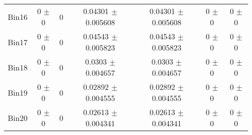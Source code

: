 \begin{tabular}{@{\extracolsep{4pt}}lcccccc@{}}
     Bin16 & 0 $\pm$ 0 & 0 & 0.04301 $\pm$ 0.005608 & 0.04301 $\pm$ 0.005608 & 0 $\pm$ 0 & 0 $\pm$ 0 \\ 
     Bin17 & 0 $\pm$ 0 & 0 & 0.04543 $\pm$ 0.005823 & 0.04543 $\pm$ 0.005823 & 0 $\pm$ 0 & 0 $\pm$ 0 \\ 
     Bin18 & 0 $\pm$ 0 & 0 & 0.0303 $\pm$ 0.004657 & 0.0303 $\pm$ 0.004657 & 0 $\pm$ 0 & 0 $\pm$ 0 \\ 
     Bin19 & 0 $\pm$ 0 & 0 & 0.02892 $\pm$ 0.004555 & 0.02892 $\pm$ 0.004555 & 0 $\pm$ 0 & 0 $\pm$ 0 \\ 
     Bin20 & 0 $\pm$ 0 & 0 & 0.02613 $\pm$ 0.004341 & 0.02613 $\pm$ 0.004341 & 0 $\pm$ 0 & 0 $\pm$ 0 \\ 
\hline\hline
  \end{tabular}
